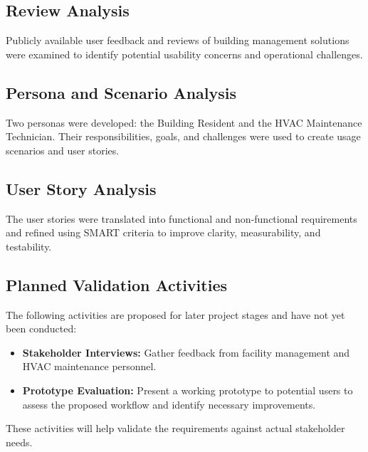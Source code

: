 \documentclass[11pt,a4paper]{article}
\begin{document}
\subsection{Review Analysis}
Publicly available user feedback and reviews of building management solutions were examined to identify potential usability concerns and operational challenges.

\subsection{Persona and Scenario Analysis}
Two personas were developed: the Building Resident and the HVAC Maintenance Technician. Their responsibilities, goals, and challenges were used to create usage scenarios and user stories.

\subsection{User Story Analysis}
The user stories were translated into functional and non-functional requirements and refined using SMART criteria to improve clarity, measurability, and testability.

\subsection*{Planned Validation Activities}
The following activities are proposed for later project stages and have not yet been conducted:
\begin{itemize}
\item \textbf{Stakeholder Interviews:} Gather feedback from facility management and HVAC maintenance personnel.
\item \textbf{Prototype Evaluation:} Present a working prototype to potential users to assess the proposed workflow and identify necessary improvements.
\end{itemize}
These activities will help validate the requirements against actual stakeholder needs.
\end{document}
